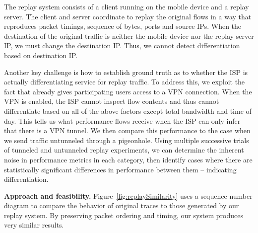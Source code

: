 The replay system consists of a client running on the mobile device and a replay server. 
The client and server coordinate to replay the original flows in a way that reproduces packet timings, 
sequence of bytes, ports and source IPs. When the destination of the original traffic is neither the 
mobile device nor the replay server IP, we must change the destination IP. Thus, we cannot detect 
differentiation based on destination IP. 

Another key challenge is how to establish ground truth as to whether the ISP is 
actually differentiating service for replay traffic. To address this, we exploit the fact 
that \meddle already gives participating users access to a VPN connection. When the 
VPN is enabled, the ISP cannot inspect flow contents and thus cannot differentiate based 
on all of the above factors except total bandwidth and time of day. This tells us what 
performance flows receive when the ISP can only infer that there is a VPN tunnel. 
We then compare this performance to the case when we send traffic untunneled through a 
pigeonhole. Using multiple successive trials of tunneled and untunneled replay experiments, 
we can determine the inherent noise in performance metrics in each category, then 
identify cases where there are statistically significant differences in performance between 
them -- indicating differentiation. 





\noindent\textbf{Approach and feasibility.}
Figure~\ref{fig:replaySimilarity} uses a sequence-number diagram to compare the behavior of original traces 
to those generated by our replay system. By preserving packet ordering and timing, our 
system produces very similar results. 

